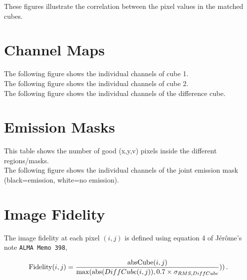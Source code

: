\documentclass[11pt]{article}
\begin{document}
\noindent These figures illustrate the correlation between the pixel
values in the matched cubes.

 
 
 
 

\section{Channel Maps}
\label{sect:channel_maps}

\noindent The following figure shows the individual channels of cube 1.\\



\noindent The following figure shows the individual channels of cube 2.\\



\noindent The following figure shows the individual channels of the difference cube.\\



\section{Emission Masks}
\label{sect:emission_masks}

\noindent This table shows the number of good (x,y,v) pixels inside the different regions/masks.\\



\noindent The following figure shows the individual channels of the
joint emission mask (black=emission, white=no emission).\\



\section{Image Fidelity}
\label{sec:fidelity}

\noindent The image fidelity at each pixel $(i,j)$ is defined using
equation 4 of J\'er\^ome's note {\tt ALMA Memo 398},

\begin{equation}
{\rm Fidelity}(i,j)  =\frac{{\rm abs}{\rm Cube}(i,j)}{{\rm max}({\rm abs}(DiffCube(i,j)),0.7\times \sigma_{RMS,DiffCube}}))\,.
\end{equation}
\end{document}
